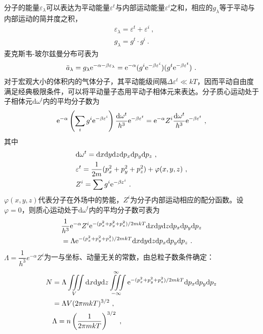 \documentclass[12pt,a4paper]{article}
\newcommand{\dif}{\mathrm{d}}
\begin{document}
分子的能量$\varepsilon_\lambda$可以表达为平动能量$\varepsilon^t$与内部运动能量$\varepsilon^i$之和，相应的$g_\lambda$等于平动与内部运动的简并度之积，
\begin{align}
& \varepsilon_\lambda = \varepsilon^t + \varepsilon^i ~, \\
& g_\lambda = g^t \cdot g^i ~.
\end{align}
麦克斯韦-玻尔兹曼分布可表为
\begin{equation}
\bar{a}_\lambda = g_\lambda {\rm e}^{-\alpha -\beta \varepsilon_\lambda} = {\rm e}^{-\alpha} (g^i {\rm e}^{-\beta \varepsilon^i}) (g^t {\rm e}^{-\beta \varepsilon^t}) ~.
\end{equation}
对于宏观大小的体积内的气体分子，其平动能级间隔$\Delta \varepsilon^t \ll kT$，因而平动自由度满足经典极限条件，可以将平动量子态用平动子相体元来表达。分子质心运动处于子相体元$\dif \omega^t$内的平均分子数为
\begin{equation}
{\rm e}^{-\alpha} \left(\sum_i g^i {\rm e}^{-\beta \varepsilon^i} \right) \dfrac{\dif \omega^t}{h^3} {\rm e}^{-\beta \varepsilon^t} = {\rm e}^{-\alpha} Z^i  \dfrac{\dif \omega^t}{h^3} {\rm e}^{-\beta \varepsilon^t} ~,
\end{equation}
其中
\begin{align}
& \dif \omega^t = \dif x \dif y \dif z \dif p_x \dif p_y \dif p_z ~, \\
& \varepsilon^t = \dfrac{1}{2m} (p^2_x +p^2_y +p^2_z) +\varphi(x, y, z) ~, \\
& Z^i = \sum g^i {\rm e}^{-\beta \varepsilon^i} ~.
\end{align}
$\varphi(x, y, z)$代表分子在外场中的势能，$Z^i$为分子内部运动相应的配分函数。设$\varphi=0$，则质心运动处于$\dif \omega^t $内的平均分子数可表为
\begin{align}
\nonumber & \dfrac{1}{h^3} {\rm e}^{-\alpha} Z^i {\rm e}^{-(p^2_x +p^2_y +p^2_z)/2mkT} \dif x \dif y \dif z \dif p_x \dif p_y \dif p_z \\
& = \Lambda {\rm e}^{-(p^2_x +p^2_y +p^2_z)/2mkT} \dif x \dif y \dif z \dif p_x \dif p_y \dif p_z ~.
\end{align}
$\Lambda = \dfrac{1}{h^3} e^{-\alpha} Z^i$为一与坐标、动量无关的常数，由总粒子数条件确定：
\begin{align}
\nonumber N &= \Lambda \iiint\limits_V \dif x \dif y \dif z \iiint\limits_{-\infty}^\infty {\rm e}^{-(p^2_x +p^2_y +p^2_z)/2mkT}  \dif p_x \dif p_y \dif p_z \\
& = \Lambda V (2\pi mkT)^{3/2}  ~, \\
& \Lambda = n \left(\dfrac{1}{2\pi mkT} \right)^{3/2} ~,
\end{align}
\end{document}
